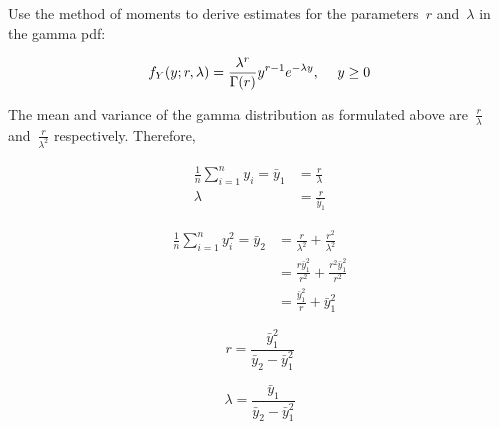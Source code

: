 \begin{problem}
   Use the method of moments to derive estimates for the parameters~$r$ and~$\lambda$ in the gamma pdf:

  \begin{equation}
    f_{Y}(y;r,\lambda) = \frac{\lambda^{r}}{\Gamma(r)} y^{r-1} e^{-\lambda y}\text{,} \hspace{0.5cm}y \geq 0
  \end{equation}
\end{problem}


The mean and variance of the gamma distribution as formulated above are~$\frac{r}{\lambda}$ and~$\frac{r}{\lambda^2}$ respectively.  Therefore,

\begin{align}
  \frac{1}{n} \sum_{i=1}^{n} y_i = \bar{y}_1 &= \frac{r}{\lambda} \\
                         \lambda &= \frac{r}{\bar{y}_{1}}
\end{align}

\begin{align}
  \frac{1}{n} \sum_{i=1}^{n} y_{i}^{2} = \bar{y}_2  &= \frac{r}{\lambda^{2}} + \frac{r^2}{\lambda^2} \\
                                        &= \frac{r\bar{y}_{1}^2}{r^2} + \frac{r^2\bar{y}_{1}^2}{r^2} \\
                                        &= \frac{\bar{y}_{1}^2}{r} + \bar{y}_{1}^2
\end{align}

\begin{equation}
  r = \boxed{\frac{\bar{y}_{1}^{2}}{\bar{y}_{2} - \bar{y}_{1}^{2}}}
\end{equation}

\begin{equation}
  \lambda = \boxed{\frac{\bar{y}_{1}}{\bar{y}_{2} - \bar{y}_{1}^{2}}}
\end{equation}
